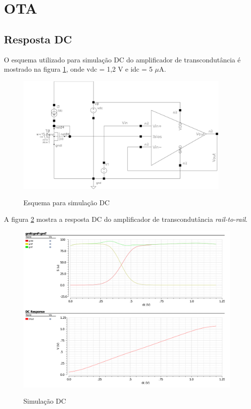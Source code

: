 \documentclass[
	12pt,				%
	oneside,			%
	a4paper,			%
	english,			%
	french,				%
	spanish,			%
	brazil				%
	]{abntex2}
\begin{document}
\section{OTA}
\subsection{Resposta DC}
O esquema utilizado para simulação DC do amplificador de transcondutância é mostrado na figura \ref{esquemaOTA_DC}, onde vdc = 1,2 V e idc = 5 $\mu$A. 
\begin{figure}[!ht]
  \centering
  \includegraphics[width=300pt]{esquemaOTA_DC.jpg}\\
  \caption{Esquema para simulação DC}\label{esquemaOTA_DC}
\end{figure}

A figura \ref{resDC} mostra a resposta DC do amplificador de transcondutância \textit{rail-to-rail}. 

\begin{figure}[!ht]
  \centering
  \includegraphics[width=450pt]{OTA_DC.png}\\
  \caption{Simulação DC}\label{resDC}
\end{figure}
\end{document}
